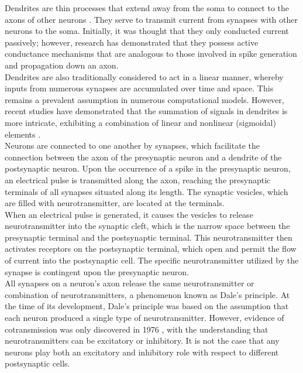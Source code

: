 \noindent Dendrites are thin processes that extend away from the soma to connect to the axons of other neurons \cite{johnston1996active}. They serve to transmit current from synapses with other neurons to the soma. Initially, it was thought that they only conducted current passively; however, research has demonstrated that they possess active conductance mechanisms that are analogous to those involved in spike generation and propagation down an axon.\\

\noindent Dendrites are also traditionally considered to act in a linear manner, whereby inputs from numerous synapses are accumulated over time and space. This remains a prevalent assumption in numerous computational models. However, recent studies have demonstrated that the summation of signals in dendrites is more intricate, exhibiting a combination of linear and nonlinear (sigmoidal) elements \cite{polsky2004computational}.\\

\noindent Neurons are connected to one another by synapses, which facilitate the connection between the axon of the presynaptic neuron and a dendrite of the postsynaptic neuron. Upon the occurrence of a spike in the presynaptic neuron, an electrical pulse is transmitted along the axon, reaching the presynaptic terminals of all synapses situated along its length. The synaptic vesicles, which are filled with neurotransmitter, are located at the terminals. \\

\noindent When an electrical pulse is generated, it causes the vesicles to release neurotransmitter into the synaptic cleft, which is the narrow space between the presynaptic terminal and the postsynaptic terminal. This neurotransmitter then activates receptors on the postsynaptic terminal, which open and permit the flow of current into the postsynaptic cell. The specific neurotransmitter utilized by the synapse is contingent upon the presynaptic neuron. \\

\noindent All synapses on a neuron's axon release the same neurotransmitter or combination of neurotransmitters, a phenomenon known as Dale's principle. At the time of its development, Dale's principle was based on the assumption that each neuron produced a single type of neurotransmitter. However, evidence of cotransmission was only discovered in 1976 \cite{burnstock2004cotransmission}, with the understanding that neurotransmitters can be excitatory or inhibitory. It is not the case that any neurons play both an excitatory and inhibitory role with respect to different postsynaptic cells. \\

